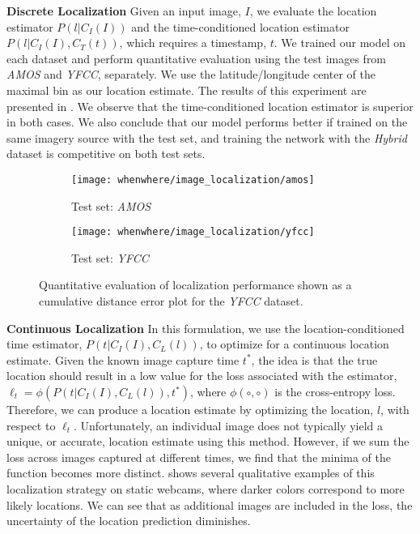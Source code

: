 \noindent \textbf{Discrete Localization} Given an input image, $I$, we
evaluate the location estimator $P(l|C_I(I))$ and the time-conditioned
location estimator $P(l|C_I(I),C_T(t))$, which requires a timestamp,
$t$. We trained our model on each dataset and perform quantitative
evaluation using the test images from {\em AMOS} and {\em YFCC},
separately. We use the latitude/longitude center of the maximal bin as
our location estimate.  The results of this experiment are presented
in .  We observe that the time-conditioned
location estimator is superior in both cases. We also conclude that
our model performs better if trained on the same imagery source with
the test set, and training the network with the {\em Hybrid} dataset
is competitive on both test sets. 

\begin{figure}
  \centering
  
  \begin{subfigure}[b]{0.47\linewidth}
    \texttt{[image: whenwhere/image\_localization/amos]}
    \caption{Test set: {\em AMOS}}
  \end{subfigure}
  \begin{subfigure}[b]{0.47\linewidth}
    \texttt{[image: whenwhere/image\_localization/yfcc]}
    \caption{Test set: {\em YFCC}}
  \end{subfigure}
  
  \caption{Quantitative evaluation of localization performance shown
  as a cumulative distance error plot for the {\em YFCC} dataset.}
  
  \label{fig:image_localization}
\end{figure}
%

\noindent \textbf{Continuous Localization} In this formulation, we use
the location-conditioned time estimator, $P(t|C_I(I),C_L(l))$, to
optimize for a continuous location estimate.  Given the known image
capture time $t^*$, the idea is that the true location should result
in a low value for the loss associated with the estimator, $\ell_t =
\phi(P(t|C_I(I),C_L(l)), t^*)$, where $\phi(\circ,\circ)$ is the
cross-entropy loss. Therefore, we can produce a location estimate by
optimizing the location, $l$, with respect to $\ell_t$. Unfortunately,
an individual image does not typically yield a unique, or accurate,
location estimate using this method. However, if we sum the loss
across images captured at different times, we find that the minima of
the function becomes more distinct.  shows
several qualitative examples of this localization strategy on static
webcams, where darker colors correspond to more likely locations. We
can see that as additional images are included in the loss, the
uncertainty of the location prediction diminishes.

